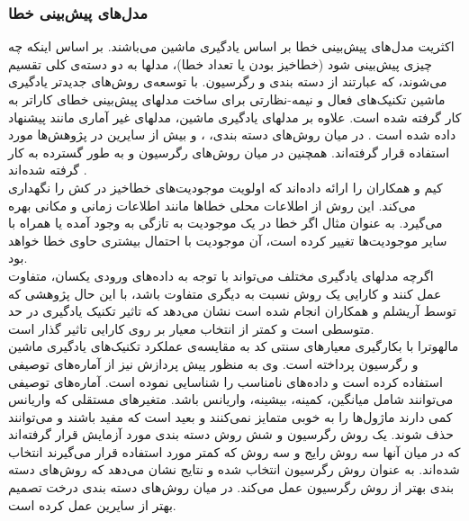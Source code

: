 
\subsubsection{مدل‌های پیش‌بینی خطا}
اکثریت مدل‌های پیش‌بینی خطا بر اساس یادگیری ماشین می‌باشند. بر اساس اینکه چه چیزی پیش‌بینی شود (خطاخیز بودن یا تعداد خطا)، مدلها به دو دسته‌ی کلی تقسیم می‌شوند، که عبارتند از دسته بندی و رگرسیون. با توسعه‌ی روش‌های جدیدتر یادگیری ماشین تکنیک‌های فعال و نیمه-نظارتی برای ساخت مدلهای پیش‌بینی خطای کاراتر به کار گرفته شده است\cite{li2012sample}. علاوه بر مدلهای یادگیری ماشین، مدلهای غیر آماری مانند  پیشنهاد داده شده است \cite{kim2007predicting}. در میان روش‌های دسته بندی، 
 ،
 و
بیش از سایرین در پژوهش‌ها مورد استفاده قرار گرفته‌اند. همچنین در میان روش‌های رگرسیون 
 و 
به طور گسترده به کار گرفته شده‌اند \cite{nam2014survey}. \\
کیم و همکاران  را ارائه داده‌اند که  اولویت موجودیت‌های خطاخیز در کش  را نگهداری  می‌کند. این روش از اطلاعات محلی خطاها مانند اطلاعات زمانی و مکانی بهره می‌گیرد. به عنوان مثال اگر خطا در یک موجودیت به تازگی به وجود آمده یا همراه با سایر موجودیت‌ها تغییر کرده است، آن موجودیت با احتمال بیشتری حاوی خطا خواهد بود.\\
اگرچه مدلهای یادگیری مختلف می‌تواند  با توجه به داده‌های ورودی یکسان، متفاوت عمل کنند و کارایی یک روش نسبت به دیگری متفاوت باشد، با این حال پژوهشی که توسط آریشلم  و همکاران  \cite{arisholm2010systematic} انجام شده است نشان می‌دهد که تاثیر  تکنیک یادگیری در حد متوسطی است و کمتر از انتخاب معیار بر روی کارایی تاثیر گذار است.  \\

مالهوترا با بکارگیری معیارهای سنتی کد به مقایسه‌ی عملکرد تکنیک‌های یادگیری ماشین و رگرسیون پرداخته است\cite{malhotra2014comparative}. وی به منظور پیش پردازش نیز از آماره‌های توصیفی  استفاده کرده است و داده‌های نامناسب را شناسایی نموده است. آماره‌های توصیفی می‌توانند شامل میانگین، کمینه، بیشینه، واریانس باشد. متغیرهای مستقلی که  واریانس کمی دارند ماژول‌ها را به خوبی متمایز نمی‌کنند و بعید است که مفید باشند و می‌توانند حذف شوند. یک روش رگرسیون و شش روش دسته بندی مورد آزمایش قرار گرفته‌اند که در میان آنها سه روش رایج و سه روش که کمتر مورد استفاده قرار می‌گیرند انتخاب شده‌اند.  به عنوان روش رگرسیون انتخاب شده و نتایج نشان می‌دهد که روش‌های دسته بندی بهتر از روش رگرسیون عمل می‌کند. در میان روش‌های دسته بندی درخت تصمیم  بهتر از سایرین عمل کرده است. 


